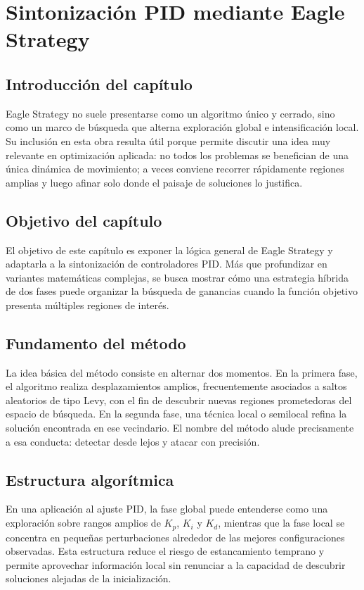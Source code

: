 \chapter{Sintonización PID mediante Eagle Strategy}
\label{ch:eagle-strategy}

\section{Introducción del capítulo}
Eagle Strategy no suele presentarse como un algoritmo único y cerrado, sino como un marco de
búsqueda que alterna exploración global e intensificación local. Su inclusión en esta obra
resulta útil porque permite discutir una idea muy relevante en optimización aplicada: no todos
los problemas se benefician de una única dinámica de movimiento; a veces conviene recorrer
rápidamente regiones amplias y luego afinar solo donde el paisaje de soluciones lo justifica.

\section{Objetivo del capítulo}
El objetivo de este capítulo es exponer la lógica general de Eagle Strategy y adaptarla a la
sintonización de controladores PID. Más que profundizar en variantes matemáticas complejas,
se busca mostrar cómo una estrategia híbrida de dos fases puede organizar la búsqueda de
ganancias cuando la función objetivo presenta múltiples regiones de interés.

\section{Fundamento del método}
La idea básica del método consiste en alternar dos momentos. En la primera fase, el algoritmo
realiza desplazamientos amplios, frecuentemente asociados a saltos aleatorios de tipo Levy, con
el fin de descubrir nuevas regiones prometedoras del espacio de búsqueda. En la segunda
fase, una técnica local o semilocal refina la solución encontrada en ese vecindario. El nombre
del método alude precisamente a esa conducta: detectar desde lejos y atacar con precisión.

\section{Estructura algorítmica}
En una aplicación al ajuste PID, la fase global puede entenderse como una exploración sobre
rangos amplios de $K_p$, $K_i$ y $K_d$, mientras que la fase local se concentra en pequeñas
perturbaciones alrededor de las mejores configuraciones observadas. Esta estructura reduce el
riesgo de estancamiento temprano y permite aprovechar información local sin renunciar a la
capacidad de descubrir soluciones alejadas de la inicialización.

